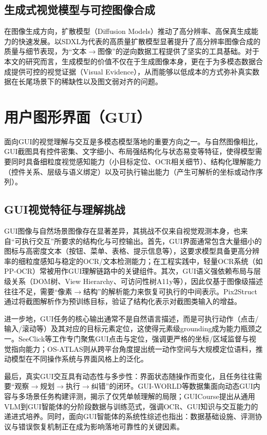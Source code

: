 \subsection{生成式视觉模型与可控图像合成}
在图像生成方向，扩散模型（Diffusion Models）推动了高分辨率、高保真生成能力的快速发展。以SDXL为代表的高质量扩散模型显著提升了高分辨率图像合成的质量与细节表现\citep{podell2023sdxl}，为“文本$\rightarrow$图像”的逆向数据工程提供了坚实的工具基础。对于本文的研究而言，生成模型的价值不仅在于生成图像本身，更在于为多模态数据合成提供可控的视觉证据（Visual Evidence），从而能够以低成本的方式弥补真实数据在长尾场景下的稀缺性以及图文弱对齐的问题。

\section{用户图形界面（GUI）}
面向GUI的视觉理解与交互是多模态模型落地的重要方向之一。与自然图像相比，GUI截图具有控件密集、文字细小、布局强结构化与状态易变等特征，使得模型需要同时具备细粒度视觉感知能力（小目标定位、OCR相关细节）、结构化理解能力（控件关系、层级与语义绑定）以及可执行输出能力（产生可解析的坐标或动作序列）。

\subsection{GUI视觉特征与理解挑战}
GUI图像与自然场景图像存在显著差异，其挑战不仅来自视觉观测本身，也来自“可执行交互”所要求的结构化与可控输出。首先，GUI界面通常包含大量细小的图标与高密度文本（按钮、菜单、表格、提示信息等），这要求模型具备更高分辨率的细粒度感知与稳定的OCR/文本检测能力；在工程实践中，轻量OCR系统（如PP-OCR）常被用作GUI理解链路中的关键组件\citep{du2020ppocr}。其次，GUI语义强依赖布局与层级关系（DOM树、View Hierarchy、可访问性树A11y等），因此仅基于图像级描述往往不足，需要“像素$\rightarrow$结构”的解析能力来恢复可执行的中间表示。Pix2Struct通过将截图解析作为预训练目标，验证了结构化表示对截图类输入的增益\citep{lee2023pix2struct}。

进一步地，GUI任务的核心输出通常不是自然语言描述，而是可执行动作（点击/输入/滚动等）及其对应的目标元素定位，这使得元素级grounding成为能力瓶颈之一。SeeClick等工作专门聚焦GUI点击与定位，强调更严格的坐标/区域监督与视觉指向能力\citep{liu2024seeclick}；OS-ATLAS则从跨平台角度提出统一动作空间与大规模定位语料，推动模型在不同操作系统与界面风格上的泛化\citep{wu2024osatlas}。

最后，真实GUI交互具有动态性与多步性：界面状态随操作而变化，且任务往往需要“观察$\rightarrow$规划$\rightarrow$执行$\rightarrow$纠错”的闭环。GUI-WORLD等数据集面向动态GUI内容与多场景任务构建评测，揭示了仅凭单帧理解的局限\citep{guiworld2024}；GUICourse提出从通用VLM到GUI智能体的分阶段数据与训练范式，强调OCR、GUI知识与交互能力的递进式培养\citep{guicourse2024}。同时，面向GUI智能体的系统性综述也指出：数据基础设施、评测协议与错误恢复机制正在成为影响落地可靠性的关键因素\citep{llmguiaentsurvey2024}。

